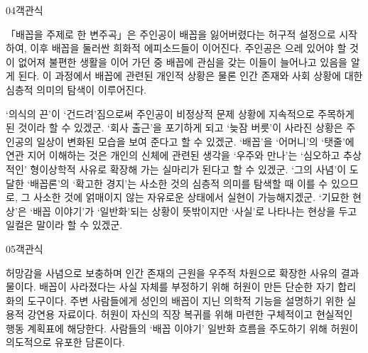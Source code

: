 \documentclass[fs85,seriesWit]{korfarm-base}
\begin{document}
\begin{kfQBlock}{04}{객관식}
\begin{kfEvidence}「배꼽을 주제로 한 변주곡」은 주인공이 배꼽을 잃어버렸다는 허구적 설정으로 시작하여, 이후 배꼽을 둘러싼 희화적 에피소드들이 이어진다. 주인공은 으레 있어야 할 것이 없어져 불편한 생활을 이어 가던 중 배꼽에 관심을 갖는 이들이 늘어나고 있음을 알게 된다. 이 과정에서 배꼽에 관련된 개인적 상황은 물론 인간 존재와 사회 상황에 대한 심층적 의미의 탐색이 이루어진다.\end{kfEvidence}
\begin{kfChoices}
\kfChoice ‘의식의 끈’이 ‘건드려’짐으로써 주인공이 비정상적 문제 상황에 지속적으로 주목하게 된 것이라 할 수 있겠군.
\kfChoice ‘회사 출근’을 포기하게 되고 ‘늦잠 버릇’이 사라진 상황은 주인공의 일상이 변화된 모습을 보여 준다고 할 수 있겠군.
\kfChoice ‘배꼽’을 ‘어머니’의 ‘탯줄’에 연관 지어 이해하는 것은 개인의 신체에 관련된 생각을 ‘우주와 만나’는 ‘심오하고 추상적인’ 형이상학적 사유로 확장해 가는 실마리가 된다고 할 수 있겠군.
\kfChoice ‘그의 사념’이 도달한 ‘배꼽론’의 ‘확고한 경지’는 사소한 것의 심층적 의미를 탐색할 때 이를 수 있으므로, 그 사소한 것에 얽매이지 않는 자유로운 상태에서 실현이 가능해지겠군.
\kfChoice ‘기묘한 현상’은 ‘배꼽 이야기’가 ‘일반화’되는 상황이 뜻밖이지만 ‘사실’로 나타나는 현상을 두고 일컬은 말이라 할 수 있겠군.
\end{kfChoices}
\end{kfQBlock}

\begin{kfQBlock}{05}{객관식}
\begin{kfChoices}
\kfChoice 허망감을 사념으로 보충하며 인간 존재의 근원을 우주적 차원으로 확장한 사유의 결과물이다.
\kfChoice 배꼽이 사라졌다는 사실 자체를 부정하기 위해 허원이 만든 단순한 자기 합리화의 도구이다.
\kfChoice 주변 사람들에게 성인의 배꼽이 지닌 의학적 기능을 설명하기 위한 실용적 강연용 자료이다.
\kfChoice 허원이 자신의 직장 복귀를 위해 마련한 구체적이고 현실적인 행동 계획표에 해당한다.
\kfChoice 사람들의 ‘배꼽 이야기’ 일반화 흐름을 주도하기 위해 허원이 의도적으로 유포한 담론이다.
\end{kfChoices}
\end{kfQBlock}

\kfEndMC
\end{document}
